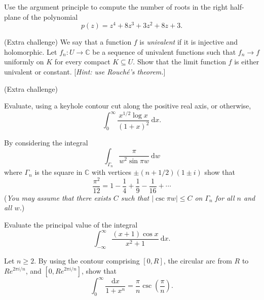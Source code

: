 \documentclass[answers]{exam}
\begin{document}
\begin{questions}
\question%
Use the argument principle to compute the number of roots in the right half-plane of the polynomial \[
	p(z)=z^4+8z^3+3z^2+8z+3.
\]



\question%
(Extra challenge) We say that a function $f$ is \emph{univalent} if it is injective and holomorphic. Let $f_n:U\to\mathbb C$ be a sequence of univalent functions such that $f_n\to f$ uniformly on $K$ for every compact $K\subseteq U$. Show that the limit function $f$ is either univalent or constant. [\emph{Hint: use Rouch\'e's theorem.}]



\question%
(Extra challenge)



\question%
Evaluate, using a keyhole contour cut along the positive real axis, or otherwise, \[
	\int_{0}^{\infty} \frac{x^{1 / 2} \log x}{(1+x)^{2}} \mathrm{~d} x.
\]



\question%
By considering the integral \[
	\int_{\Gamma_{n}} \frac{\pi}{w^{2} \sin \pi w} \mathrm{~d} w
\] where $\Gamma_{n}$ is the square in $\mathbb{C}$ with vertices $\pm(n+1 / 2)(1 \pm i)$ show that \[
	\frac{\pi^{2}}{12}=1-\frac{1}{4}+\frac{1}{9}-\frac{1}{16}+\cdots
\] (\emph{You may assume that there exists $C$ such that $|\csc \pi w| \leqslant C$ on $\Gamma_{n}$ for all $n$ and all $w$.})



\question%
Evaluate the principal value of the integral \[
	\int_{-\infty}^\infty\frac{(x+1)\cos x}{x^2+1}~\mathrm dx.
\]



\question%
Let $n \geqslant 2$. By using the contour comprising $[0, R]$, the circular arc from $R$ to $R e^{2 \pi i / n}$, and $[0, R e^{2 \pi i / n}]$, show that \[
	\int_{0}^{\infty}\frac{\mathrm{d}x}{1+x^{n}}=\frac{\pi}{n}\csc\left(\frac{\pi}{n}\right).
\]




\end{questions}
\end{document}
